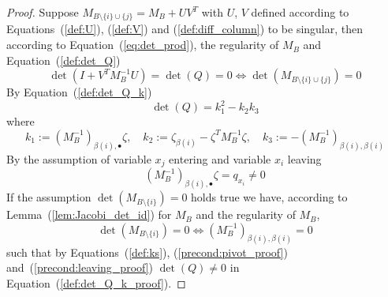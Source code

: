 \documentclass[a4paper]{article}
\begin{document}
\begin{proof}
Suppose $M_{B \setminus \{i\} \cup \{j\}}=M_{B}+UV^{T}$ with
$U$, $V$ defined according to Equations~(\ref{def:U}), (\ref{def:V})
and (\ref{def:diff_column}) to be singular, then according to
Equation~(\ref{eq:det_prod}), the regularity of $M_{B}$ and
Equation~(\ref{def:det_Q})
\begin{equation}
\label{eq:det_Q_eq_det_M_B_replaced}
\det \left(I+V^{T}M_{B}^{-1}U\right) =
\det(Q) = 0
\Longleftrightarrow
\det(M_{B \setminus \{i\} \cup \{j\}})=0
\end{equation}
By Equation~(\ref{def:det_Q_k})
\begin{equation}
\label{def:det_Q_k_proof}
\det(Q) = k_{1}^{2} - k_{2}k_{3}
\end{equation}
where
\begin{equation}
\label{def:ks}
k_{1}:=\left(M_{B}^{-1}\right)_{\beta(i), \bullet}\zeta,
\quad
k_{2}:=\zeta_{\beta(i)} - \zeta^{T}M_{B}^{-1}\zeta,
\quad
k_{3}:=-\left(M_{B}^{-1}\right)_{\beta(i), \beta(i)}
\end{equation}
By the assumption of variable $x_{j}$ entering and variable $x_{i}$ leaving
\begin{equation}
\label{precond:pivot_proof}
\left(M_{B}^{-1}\right)_{\beta(i), \bullet}
\zeta
=
q_{x_{i}}
\neq
0
\end{equation}
If the assumption $\det(M_{B\setminus \{i\}})=0$ holds true
we have, according to Lemma~(\ref{lem:Jacobi_det_id}) for $M_{B}$ and
the regularity of $M_{B}$, 
\begin{equation}
\label{precond:leaving_proof}
\det(M_{B \setminus \{i\}})=0
\Longleftrightarrow
\left(M_{B}^{-1}\right)_{\beta(i),\beta(i)}=0
\end{equation}
such that by Equations~(\ref{def:ks}), (\ref{precond:pivot_proof})
and~(\ref{precond:leaving_proof}) $\det(Q) \neq 0$ in
Equation~(\ref{def:det_Q_k_proof}).
\end{proof}
\end{document}

